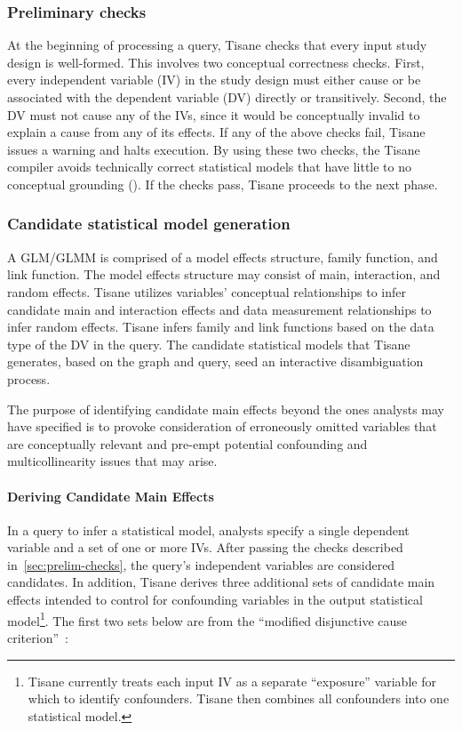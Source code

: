 \subsubsection{Preliminary checks} \label{sec:prelim-checks}
At the beginning of processing a query, Tisane checks that every input study
design is well-formed. This involves two conceptual correctness checks. First,
every independent variable (IV) in the study design must either cause or be
associated with the dependent variable (DV) directly or transitively. Second, the
DV must not cause any of the
IVs, since it would be conceptually invalid to explain a
cause from any of its effects. If any of the above checks fail, Tisane
issues a warning and halts execution. By using these two checks, the Tisane
compiler avoids technically correct statistical models that have little to no
conceptual grounding (\dcConceptualKnowledge). If the checks pass, Tisane proceeds to the next phase.

\subsubsection{Candidate statistical model generation}
A GLM/GLMM is comprised of a model effects structure, family function, and link
function. The model effects structure may consist of main, interaction, and
random effects. Tisane utilizes variables' conceptual relationships to infer candidate
main and interaction effects and data measurement relationships to infer
random effects. Tisane infers family and link functions based on the data type
of the DV in the query. The candidate statistical models that Tisane
generates, based on the graph and query, seed an interactive disambiguation
process.

The purpose of identifying candidate main effects beyond the ones analysts may
have specified is to provoke consideration of erroneously omitted variables that
are conceptually relevant and pre-empt potential confounding and
multicollinearity issues that may arise.

\paragraph{Deriving Candidate Main Effects}
In a query to infer a statistical model, analysts specify a single dependent
variable and a set of one or more IVs. After passing the checks described in~\autoref{sec:prelim-checks}, %
the query's independent variables are considered candidates. In addition, Tisane
derives three additional sets of candidate main effects intended to control for
confounding variables in the output statistical model\footnote{Tisane currently
treats each input IV as a separate ``exposure'' variable for which to identify
confounders. Tisane then combines all confounders into one statistical model.}.
The first two sets below are from the ``modified disjunctive cause
criterion''~\cite{vanderweele2019modifiedDisjunctiveCriterion}:

